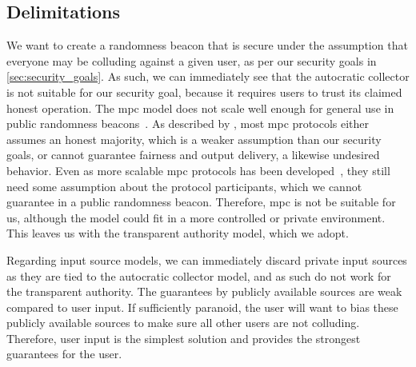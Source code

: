 \subsection{Delimitations}%
\label{sub:delimitations}
We want to create a randomness beacon that is secure under the assumption that everyone may be colluding against a given user, as per our security goals in \cref{sec:security_goals}.
As such, we can immediately see that the autocratic collector is not suitable for our security goal, because it requires users to trust its claimed honest operation.
The \gls{mpc} model does not scale well enough for general use in public randomness beacons~\cite{syta2017scalable}.
As described by \citet{damgaard2006scalable},  most \gls{mpc} protocols either assumes an honest majority, which is a weaker assumption than our security goals, or cannot guarantee fairness and output delivery, a likewise undesired behavior.
Even as more scalable \gls{mpc} protocols has been developed~\cite{damgaard2006scalable},  they still need some assumption  about the protocol participants, which we cannot guarantee in a public randomness beacon.
Therefore, \gls{mpc} is not be suitable for us, although the model could fit in a more controlled or private environment.
This leaves us with the transparent authority model, which we adopt.

Regarding input source models, we can immediately discard private input sources as they are tied to the autocratic collector model, and as such do not work for the transparent authority.
The guarantees by publicly available sources are weak compared to user input.
If sufficiently paranoid, the user will want to bias these publicly available sources to make sure all other users are not colluding.
Therefore, user input is the simplest solution and provides the strongest guarantees for the user.
